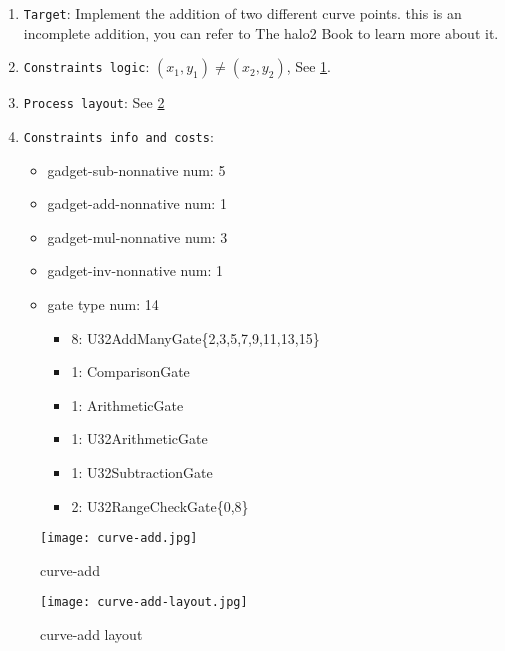 
\begin{enumerate}
    \item \verb|Target|: Implement the addition of two different curve points. this is an incomplete addition, you can refer to The halo2 Book\cite{website:halo2-book} to learn more about it.
    \item \verb|Constraints logic|: $(x_1,y_1) \ne (x_2,y_2)$, See \ref{fig:curve-add}.
    \item \verb|Process layout|: See \ref{fig:curve-add-layout}
    \item \verb|Constraints info and costs|:
    \begin{itemize}
        \item gadget-sub-nonnative num: 5
        \item gadget-add-nonnative num: 1
        \item gadget-mul-nonnative num: 3
        \item gadget-inv-nonnative num: 1
        \item gate type num: 14
            \begin{itemize}
                \item 8: U32AddManyGate\{2,3,5,7,9,11,13,15\}
                \item 1: ComparisonGate
                \item 1: ArithmeticGate
                \item 1: U32ArithmeticGate
                \item 1: U32SubtractionGate
                \item 2: U32RangeCheckGate\{0,8\}
            \end{itemize}
    \end{itemize}
\end{enumerate}

\begin{figure}[!ht]
    \centering
    \texttt{[image: curve-add.jpg]}
    \caption{curve-add}
    \label{fig:curve-add}
\end{figure}

\begin{figure}[!ht]
    \centering
    \texttt{[image: curve-add-layout.jpg]}
    \caption{curve-add layout}
    \label{fig:curve-add-layout}
\end{figure}